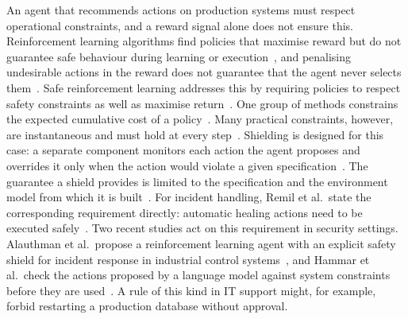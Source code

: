 \documentclass[12pt,a4paper]{article}
\begin{document}
An agent that recommends actions on production systems must respect operational constraints, and a reward signal alone does not ensure this. Reinforcement learning algorithms find policies that maximise reward but do not guarantee safe behaviour during learning or execution~\cite{alshiekh2018}, and penalising undesirable actions in the reward does not guarantee that the agent never selects them~\cite{konighofer2025}. Safe reinforcement learning addresses this by requiring policies to respect safety constraints as well as maximise return~\cite{garcia2015}. One group of methods constrains the expected cumulative cost of a policy~\cite{achiam2017,wachi2024}. Many practical constraints, however, are instantaneous and must hold at every step~\cite{zhao2023}. Shielding is designed for this case: a separate component monitors each action the agent proposes and overrides it only when the action would violate a given specification~\cite{alshiekh2018}. The guarantee a shield provides is limited to the specification and the environment model from which it is built~\cite{konighofer2025}. For incident handling, Remil et al.\ state the corresponding requirement directly: automatic healing actions need to be executed safely~\cite{remil2024}. Two recent studies act on this requirement in security settings. Alauthman et al.\ propose a reinforcement learning agent with an explicit safety shield for incident response in industrial control systems~\cite{alauthman2026}, and Hammar et al.\ check the actions proposed by a language model against system constraints before they are used~\cite{hammar2026llm}. A rule of this kind in IT support might, for example, forbid restarting a production database without approval.
\end{document}
